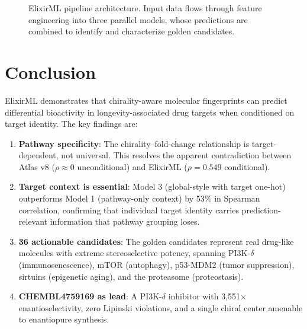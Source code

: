 \documentclass[11pt,a4paper]{article}
\begin{document}
\begin{figure}[H]
\caption{ElixirML pipeline architecture. Input data flows through feature
engineering into three parallel models, whose predictions are combined
to identify and characterize golden candidates.}
\label{fig:architecture}
\end{figure}

\section{Conclusion}

ElixirML demonstrates that chirality-aware molecular fingerprints can
predict differential bioactivity in longevity-associated drug targets
when conditioned on target identity. The key findings are:

\begin{enumerate}
    \item \textbf{Pathway specificity}: The chirality--fold-change
          relationship is target-dependent, not universal. This resolves
          the apparent contradiction between Atlas v8 ($\rho \approx 0$
          unconditional) and ElixirML ($\rho = 0.549$ conditional).

    \item \textbf{Target context is essential}: Model 3 (global-style
          with target one-hot) outperforms Model 1 (pathway-only context)
          by 53\% in Spearman correlation, confirming that individual
          target identity carries prediction-relevant information that
          pathway grouping loses.

    \item \textbf{36 actionable candidates}: The golden candidates
          represent real drug-like molecules with extreme stereoselective
          potency, spanning PI3K-$\delta$ (immunosenescence), mTOR
          (autophagy), p53-MDM2 (tumor suppression), sirtuins (epigenetic
          aging), and the proteasome (proteostasis).

    \item \textbf{CHEMBL4759169 as lead}: A PI3K-$\delta$ inhibitor with
          3{,}551$\times$ enantioselectivity, zero Lipinski violations,
          and a single chiral center amenable to enantiopure synthesis.
\end{enumerate}
\end{document}
